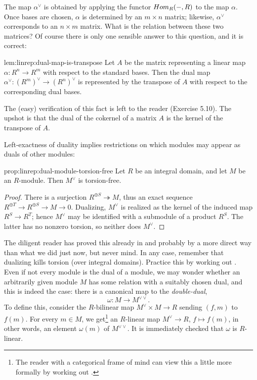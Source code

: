 The map $\alpha^\vee$ is obtained by applying the functor
$Hom_R(-,R)$ to the map $\alpha$. Once bases are chosen, $\alpha$ is
determined by an $m \times n$ matrix; likewise, $\alpha^\vee$
corresponds to an $n \times m$ matrix. What is the relation between
these two matrices? Of course there is only one sensible answer to
this question, and it is correct:
\begin{lem}{}{lem:linrep:dual-map-is-transpose}
  Let $A$ be the matrix representing a linear map
  $\alpha : R^n \to R^m$ with respect to the standard bases. Then the
  dual map $\alpha^\vee : (R^m)^\vee \to (R^n)^\vee$ is represented by
  the transpose of $A$ with respect to the corresponding dual bases.
\end{lem}

The (easy) verification of this fact is left to the reader (Exercise
5.10). The upshot is that the dual of the cokernel of a matrix $A$ is
the kernel of the transpose of $A$.

Left-exactness of duality implies restrictions on which modules may
appear as duals of other modules:
\begin{prop}{}{prop:linrep:dual-module-torsion-free}
  Let $R$ be an integral domain, and let $M$ be an $R$-module. Then
  $M^\vee$ is torsion-free.
\end{prop}

\begin{proof}
  There is a surjection $R^{\oplus S} \twoheadrightarrow M$, thus an
  exact sequence $R^{\oplus T} \to R^{\oplus S} \to M \to 0$.
  Dualizing, $M^\vee$ is realized as the kernel of the induced map
  $R^S \to R^T$; hence $M^\vee$ may be identified with a submodule of
  a product $R^S$. The latter has no nonzero torsion, so neither does
  $M^\vee$.
\end{proof}

The diligent reader has proved this already in
 and
probably by a more direct way than what we did just now, but never
mind. In any case, remember that dualizing kills torsion (over
integral domains). Practice this by working out
.  Even if
not every module is the dual of a module, we may wonder whether an
arbitrarily given module $M$ has some relation with a suitably chosen
dual, and this is indeed the case: there is a canonical map to the
\emph{double-dual},
\[
  \omega : M \to M^{\vee\vee}.
\]
To define this, consider the $R$-bilinear map $M^\vee \times M \to R$
sending $(f, m)$ to $f(m)$. For every $m \in M$, we get\footnote{The
  reader with a categorical frame of mind can view this a little more
  formally by working out
  .} an $R$-linear
map $M^\vee \to R$, $f \mapsto f(m)$, in other words, an element
$\omega(m)$ of $M^{\vee\vee}$. It is immediately checked that $\omega$
is $R$-linear.


